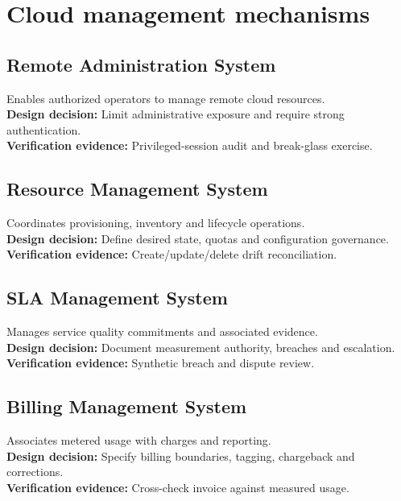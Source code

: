 \documentclass[10pt,letterpaper]{article}
\begin{document}
\section{Cloud management mechanisms}
\subsection{Remote Administration System}
Enables authorized operators to manage remote cloud resources.\\[4pt]
\textbf{Design decision:} Limit administrative exposure and require strong authentication.\\[3pt]
\textbf{Verification evidence:} Privileged-session audit and break-glass exercise.\\[3pt]
\subsection{Resource Management System}
Coordinates provisioning, inventory and lifecycle operations.\\[4pt]
\textbf{Design decision:} Define desired state, quotas and configuration governance.\\[3pt]
\textbf{Verification evidence:} Create/update/delete drift reconciliation.\\[3pt]
\subsection{SLA Management System}
Manages service quality commitments and associated evidence.\\[4pt]
\textbf{Design decision:} Document measurement authority, breaches and escalation.\\[3pt]
\textbf{Verification evidence:} Synthetic breach and dispute review.\\[3pt]
\subsection{Billing Management System}
Associates metered usage with charges and reporting.\\[4pt]
\textbf{Design decision:} Specify billing boundaries, tagging, chargeback and corrections.\\[3pt]
\textbf{Verification evidence:} Cross-check invoice against measured usage.\\[3pt]
\end{document}
